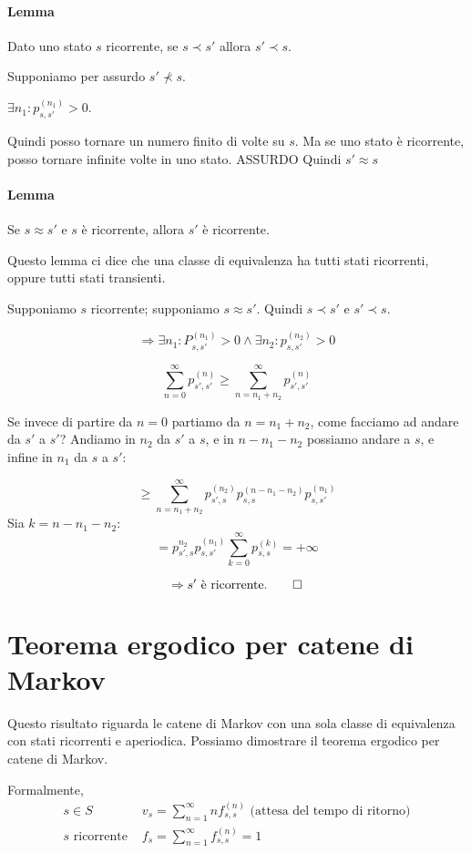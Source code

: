 \documentclass[a4paper,12pt]{book}
\begin{document}
\paragraph{Lemma} Dato uno stato $ s $ ricorrente, se $ s \prec s' $ allora $ s' \prec s $.

Supponiamo per assurdo $ s' \nprec s $.

$ \exists n_1 : p_{s,s'}^{(n_1)} > 0$.

Quindi posso tornare un numero finito di volte su $ s $. Ma se uno stato è ricorrente, posso tornare infinite volte in uno stato. ASSURDO
Quindi $ s' \approx s $

\paragraph{Lemma} Se $ s \approx s' $ e $ s $ è ricorrente, allora $ s' $ è ricorrente. 

Questo lemma ci dice che una classe di equivalenza ha tutti stati ricorrenti, oppure tutti stati transienti. 

Supponiamo $ s $ ricorrente; supponiamo $ s \approx s' $. Quindi $ s \prec s' $ e $ s' \prec s $. 

$$ \Rightarrow \exists n_1 : P_{s,s'}^{(n_1)} > 0 \land \exists n_2 : p_{s,s'}^{(n_2)} > 0 $$

$$ \sum_{n=0}^{\infty} p_{s',s'}^{(n)} \ge \sum_{n = n_1 + n_2}^{\infty} p_{s',s'}^{(n)} $$ 

Se invece di partire da $ n = 0 $ partiamo da $ n = n_1+n_2 $, come facciamo ad andare da $ s' $ a $ s' $? Andiamo in $ n_2 $ da $ s' $ a $ s $, e in $ n - n_1 - n_2 $ possiamo andare a $ s $, e infine in $ n_1 $ da $ s $ a $ s' $:

$$ \ge \sum_{n=n_1+n_2}^{\infty} p_{s',s}^{(n_2)} p_{s,s}^{(n-n_1-n_2)} p_{s,s'}^{(n_1)} $$
Sia $ k = n-n_1-n_2 $:
$$ = p_{s',s}^{n_2} p_{s,s'}^{(n_1)} \sum_{k=0}^{\infty} p_{s,s}^{(k)} = +\infty$$

$$ \Rightarrow s' \text{ è ricorrente.} \qed $$

\section{Teorema ergodico per catene di Markov}
Questo risultato riguarda le catene di Markov con una sola classe di equivalenza con stati ricorrenti e aperiodica. Possiamo dimostrare il teorema ergodico per catene di Markov. 

Formalmente, 
$$ 
\begin{array}{cc}
	s \in S & v_s = \sum_{n=1}^{\infty} n f_{s,s}^{(n)} \text{ (attesa del tempo di ritorno)} \\
	s \text{ ricorrente } & f_s = \sum_{n=1}^{\infty} f_{s,s}^{(n)} = 1 \\  
\end{array} $$
\end{document}
